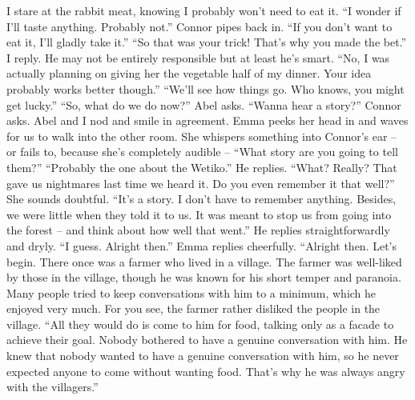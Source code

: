 \documentclass[openany, 12pt]{book}
\newcommand\tab[1][1cm]{\hspace*{#1}}
\begin{document}
\newline
\tab
I stare at the rabbit meat, knowing I probably won’t need to eat it. ``I wonder if I’ll taste anything. Probably not.''
\newline
\tab
Connor pipes back in. ``If you don’t want to eat it, I’ll gladly take it.''
\newline
\tab
``So that was your trick! That’s why you made the bet.'' I reply. He may not be entirely responsible but at least he’s smart.
\newline
\tab
``No, I was actually planning on giving her the vegetable half of my dinner. Your idea probably works better though.''
\newline
\tab
``We’ll see how things go. Who knows, you might get lucky.''
\newline
\tab
``So, what do we do now?'' Abel asks.
\newline
\tab
``Wanna hear a story?'' Connor asks.
\newline
\tab
Abel and I nod and smile in agreement. Emma peeks her head in and waves for us to walk into the other room. She whispers something into Connor’s ear -- or fails to, because she’s completely audible -- ``What story are you going to tell them?''
\newline
\tab
``Probably the one about the Wetiko.'' He replies.
\newline
\tab
``What? Really? That gave us nightmares last time we heard it. Do you even remember it that well?'' She sounds doubtful. 
\newline
\tab
``It’s a story. I don’t have to remember anything. Besides, we were little when they told it to us. It was meant to stop us from going into the forest -- and think about how well that went.'' He replies straightforwardly and dryly.
\newline
\tab
``I guess. Alright then.'' Emma replies cheerfully. 
\newline
\tab
``Alright then. Let’s begin. There once was a farmer who lived in a village. The farmer was well-liked by those in the village, though he was known for his short temper and paranoia. Many people tried to keep conversations with him to a minimum, which he enjoyed very much. For you see, the farmer rather disliked the people in the village.
\newline
\tab 
``All they would do is come to him for food, talking only as a facade to achieve their goal. Nobody bothered to have a genuine conversation with him. He knew that nobody wanted to have a genuine conversation with him, so he never expected anyone to come without wanting food. That’s why he was always angry with the villagers.''
\end{document}
